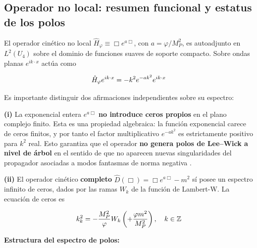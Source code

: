 ﻿\documentclass[11pt,letterpaper]{article}
\begin{document}
\subsection{Operador no local: resumen funcional y estatus de los polos}
El operador cinético no local $\hat{H}_\varphi \equiv \Box e^{a\Box}$, con $a = \varphi/M_P^2$, es autoadjunto en $L^2(U_4)$ sobre el dominio de funciones suaves de soporte compacto. Sobre ondas planas $e^{ik\cdot x}$ actúa como

\begin{equation*}
  \resizebox{\ifdim\width>\linewidth \linewidth\else\width\fi}{!}{$\displaystyle \hat{H}_\varphi e^{ik\cdot x} = -k^2 e^{-ak^2}e^{ik\cdot x}$}
\end{equation*}

Es importante distinguir dos afirmaciones independientes sobre su espectro:

\textbf{(i)} La exponencial entera $e^{a\Box}$ \textbf{no introduce ceros propios} en el plano complejo finito. Esta es una propiedad algebraica: la función exponencial carece de ceros finitos, y por tanto el factor multiplicativo $e^{-ak^2}$ es estrictamente positivo para $k^2$ real. Esto garantiza que el operador \textbf{no genera polos de Lee--Wick a nivel de árbol} en el sentido de que no aparecen nuevas singularidades del propagador asociadas a modos fantasmas de norma negativa \cite{AnselmiPiva2017a}.

\textbf{(ii)} El operador cinético \textbf{completo} $\hat{D}(\Box) = \Box e^{a\Box} - m^2$ sí posee un espectro infinito de ceros, dados por las ramas $W_k$ de la función de Lambert-W. La ecuación de ceros es

\begin{equation*}
  \resizebox{\ifdim\width>\linewidth \linewidth\else\width\fi}{!}{$\displaystyle k_k^2 = -\frac{M_P^2}{\varphi}W_k\left(+\frac{\varphi m^2}{M_P^2}\right), \quad k \in \mathbb{Z}$}
\end{equation*}

\textbf{Estructura del espectro de polos:}

\begin{table}[htbp]
  \centering
  \small
\end{table}
\end{document}
